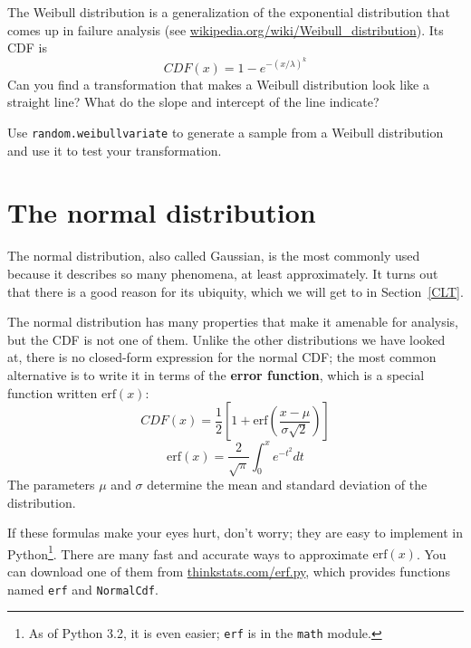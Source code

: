\documentclass[12pt]{book}
\begin{document}
\begin{ex}
\label{weibull}


The Weibull distribution is a generalization of the exponential
distribution that comes up in failure analysis
(see \url{wikipedia.org/wiki/Weibull_distribution}).  Its CDF is
%
\[ CDF(x) = 1 - e^{-(x / \lambda)^k} \]
%
Can you find a transformation that makes a Weibull distribution look
like a straight line?  What do the slope and intercept of the
line indicate?


Use {\tt random.weibullvariate} to generate a sample from a
Weibull distribution and use it to test your transformation.

\end{ex}


\section{The normal distribution}

\newcommand{\erf}{\mathrm{erf}}

The normal distribution, also called Gaussian, is the most commonly
used because it describes so many phenomena, at least approximately.
It turns out that there is a good reason for its ubiquity, which we
will get to in Section~\ref{CLT}.


The normal distribution has many properties that make it amenable for
analysis, but the CDF is not one of them.  Unlike the
other distributions we have looked at, there is no closed-form
expression for the normal CDF; the most common alternative is to write
it in terms of the {\bf error function}, which is a special function
written $\erf(x)$:
%
\[ CDF(x) = \frac{1}{2} \left[ 1 +
  \erf \left( \frac{x - \mu}{\sigma \sqrt{2}} \right) \right] \]
%
\[ \erf(x) = \frac{2}{\sqrt{\pi}} \int_{0}^x e^{-t^2} dt \]
%
The parameters $\mu$ and $\sigma$ determine the mean and standard
deviation of the distribution.


If these formulas make your eyes hurt, don't worry; they are easy to
implement in Python\footnote{As of Python 3.2, it is even easier; 
{\tt erf} is in the {\tt math} module.}.  There are many fast and
accurate ways to approximate $\erf(x)$.  You can download one of them
from \url{thinkstats.com/erf.py}, which provides functions named
{\tt erf} and {\tt NormalCdf}.
\end{document}
